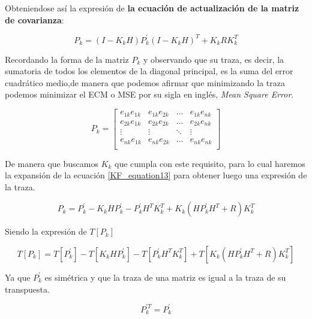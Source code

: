 \documentclass[10pt,a4paper]{article}
\begin{document}
	Obteniendose así la expresión de \textbf{la ecuación de actualización de la matriz de covarianza}:
	
	\begin{equation}
		P_k = (I-K_k H)P^\prime_k(I-K_k H)^T + K_k R K_k^T 
		\label{KF_equation13}
	\end{equation}	
	
	Recordando la forma de la matriz $P_k$ y observando que su traza, es decir, la sumatoria de todos los elementos de la diagonal principal, es la suma del error cuadrático medio,de manera que podemos afirmar que minimizando la traza podemos minimizar el ECM o MSE por su sigla en inglés, \emph{Mean Square Error}.

	\begin{equation}
		P_k = 
		\begin{bmatrix}
			e_{1k}e_{1k} & e_{1k}e_{2k} &	\dots  & e_{1k}e_{nk} \\
			e_{2k}e_{1k} & e_{2k}e_{2k} &	\dots  & e_{2k}e_{nk} \\
			\vdots       &   \vdots     &	\ddots & \vdots       \\
			e_{nk}e_{1k} & e_{nk}e_{2k} &	\dots  & e_{nk}e_{nk} \\
		\end{bmatrix}
	\end{equation}
	
	De manera que buscamos $K_k$ que cumpla con este requisito, para lo cual haremos la expansión de la ecuación \ref{KF_equation13}  para obtener luego una expresión de la traza.
	
	\begin{equation}
		P_k = P^\prime_k - K_k H P^\prime_k - P^\prime_k H^T K^T_k + K_k (H P^\prime_k H^T + R) K^T_k
		\label{KF_equation14}
	\end{equation}	
	
	Siendo la expresión de $T[P_k]$

	\begin{equation}
		T[P_k] = T[P^\prime_k] - T[K_k H P^\prime_k] - T[P^\prime_k H^T K^T_k] + T[K_k (H P^\prime_k H^T + R) K^T_k]
		\label{KF_equation15}
	\end{equation}	
	
	Ya que $P^\prime_k$ es simétrica  y que la traza de una matriz es igual a la traza de su transpuesta.

	\begin{equation}
		P^{\prime T}_k  = P^\prime_k
		\label{KF_equation16}
	\end{equation}	
	
\end{document}
